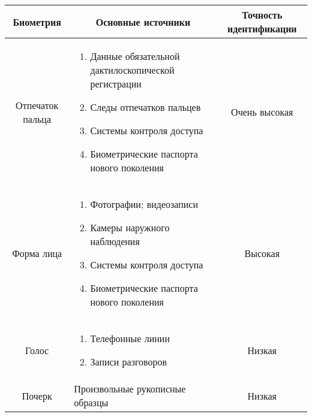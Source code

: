 \begin{multicols}{2}
\begin{table*}
\begin{center}
  \begin{tabular}{|c|p{70mm}|c|}
  \hline
\multicolumn{1}{|c|}{Биометрия}&\multicolumn{1}{c|}{Основные источники}&\multicolumn{1}{|c|}{Точность идентификации}\\
\hline
Отпечаток пальца &
\vspace*{-12pt}
\begin{enumerate}[1.]
\item Данные обязательной дактилоскопической регистрации
\item Следы отпечатков пальцев
\item Системы контроля доступа
\item Биометрические паспорта нового поколения
\end{enumerate}
\vspace*{-14pt} &  Очень высокая\\
\hline
Форма лица &
\vspace*{-12pt}
\begin{enumerate}[1.]
\item Фотографии; видеозаписи
\item Камеры наружного наблюдения
\item Системы контроля доступа
\item Биометрические паспорта нового поколения \end{enumerate}
\vspace*{-14pt}  & Высокая\\
\hline
Голос  & 
\vspace*{-12pt}
\begin{enumerate}[1.]
\item Телефонные линии
\item Записи разговоров
\end{enumerate}
\vspace*{-14pt}
&  Низкая\\
\hline
Почерк & 
Произвольные рукописные образцы & Низкая\\
\hline
\end{tabular}
\end{center}
\vspace*{-3pt}
\end{table*}


\end{multicols}
